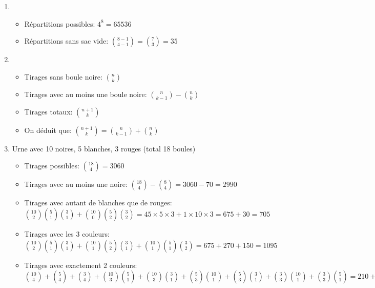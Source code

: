 \begin{enumerate}
    \item 
    \begin{itemize}
        \item Répartitions possibles: \(4^8 = 65536\)
        \item Répartitions sans sac vide: \(\binom{8-1}{4-1} = \binom{7}{3} = 35\)
    \end{itemize}
    
    \item 
    \begin{itemize}
        \item Tirages sans boule noire: \(\binom{n}{k}\)
        \item Tirages avec au moins une boule noire: \(\binom{n}{k-1} - \binom{n}{k}\)
        \item Tirages totaux: \(\binom{n+1}{k}\)
        \item On déduit que: $\binom{n+1}{k} = \binom{n}{k-1} + \binom{n}{k}$
    \end{itemize}
    
    \item Urne avec 10 noires, 5 blanches, 3 rouges (total 18 boules)
    \begin{itemize}
        \item Tirages possibles: \(\binom{18}{4} = 3060\)
        \item Tirages avec au moins une noire: \(\binom{18}{4} - \binom{8}{4} = 3060 - 70 = 2990\)
        \item Tirages avec autant de blanches que de rouges:\\
        \(\binom{10}{2}\binom{5}{1}\binom{3}{1} + \binom{10}{0}\binom{5}{2}\binom{3}{2} = 45 \times 5 \times 3 + 1 \times 10 \times 3 = 675 + 30 = 705\)
        \item Tirages avec les 3 couleurs:\\
        \(\binom{10}{2}\binom{5}{1}\binom{3}{1} + \binom{10}{1}\binom{5}{2}\binom{3}{1} + \binom{10}{1}\binom{5}{1}\binom{3}{2} = 675 + 270 + 150 = 1095\)
        \item Tirages avec exactement 2 couleurs:\\
        \(\binom{10}{4} + \binom{5}{4} + \binom{3}{4} + \binom{10}{3}\binom{5}{1} + \binom{10}{3}\binom{3}{1} + \binom{5}{3}\binom{10}{1} + \binom{5}{3}\binom{3}{1} + \binom{3}{3}\binom{10}{1} + \binom{3}{3}\binom{5}{1} = 210 + 5 + 0 + 1200 + 360 + 100 + 30 + 10 + 5 = 1920\)
    \end{itemize}
\end{enumerate}


